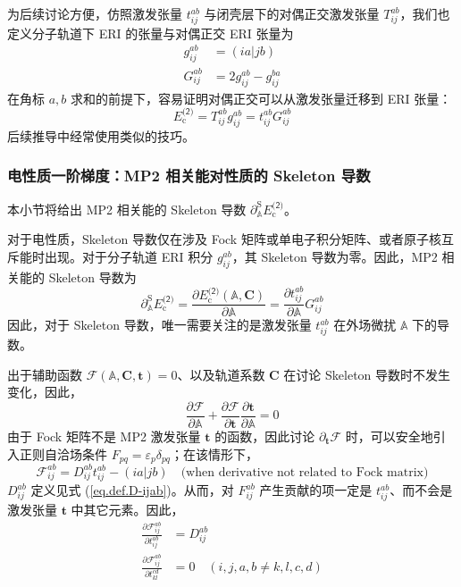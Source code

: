 为后续讨论方便，仿照激发张量 $t_{ij}^{ab}$ 与闭壳层下的对偶正交激发张量 $T_{ij}^{ab}$，我们也定义分子轨道下 ERI 的张量与对偶正交 ERI 张量为
\begin{align}
  g_{ij}^{ab} &= (ia|jb) \\
  G_{ij}^{ab} &= 2 g_{ij}^{ab} - g_{ij}^{ba}
\end{align}
在角标 $a, b$ 求和的前提下，容易证明对偶正交可以从激发张量迁移到 ERI 张量：
\begin{equation}
  E_\mathrm{c}^\textsf{(2)} = T_{ij}^{ab} g_{ij}^{ab} = t_{ij}^{ab} G_{ij}^{ab}
\end{equation}
后续推导中经常使用类似的技巧。

\subsubsection{电性质一阶梯度：MP2 相关能对性质的 Skeleton 导数}
\label{sec.3.skeleton}

本小节将给出 MP2 相关能的 Skeleton 导数 $\partial_\mathbb{A}^\mathrm{S} E_\mathrm{c}^\textsf{(2)}$。

对于电性质，Skeleton 导数仅在涉及 Fock 矩阵或单电子积分矩阵、或者原子核互斥能时出现。对于分子轨道 ERI 积分 $g_{ij}^{ab}$，其 Skeleton 导数为零。因此，MP2 相关能的 Skeleton 导数为
\begin{equation}
  \label{eq.pdSA-Ec-MP2-0}
  \partial_\mathbb{A}^\mathrm{S} E_\mathrm{c}^\textsf{(2)} = \frac{\partial E_\mathrm{c}^\textsf{(2)} (\mathbb{A}, \mathbf{C})}{\partial \mathbb{A}} = \frac{\partial t_{ij}^{ab}}{\partial \mathbb{A}} G_{ij}^{ab}
\end{equation}
因此，对于 Skeleton 导数，唯一需要关注的是激发张量 $t_{ij}^{ab}$ 在外场微扰 $\mathbb{A}$ 下的导数。

出于辅助函数 $\pmb{\mathscr{F}} (\mathbb{A}, \mathbf{C}, \mathbf{t}) = 0$、以及轨道系数 $\mathbf{C}$ 在讨论 Skeleton 导数时不发生变化，因此，
\begin{equation}
  \label{eq.auxfunc-pdA}
  \frac{\partial \pmb{\mathscr{F}}}{\partial \mathbb{A}} + \frac{\partial \pmb{\mathscr{F}}}{\partial \mathbf{t}} \frac{\partial \mathbf{t}}{\partial \mathbb{A}} = 0
\end{equation}
由于 Fock 矩阵不是 MP2 激发张量 $\mathbf{t}$ 的函数，因此讨论 $\partial_\mathbf{t} \pmb{\mathscr{F}}$ 时，可以安全地引入正则自洽场条件 $F_{pq} = \varepsilon_p \delta_{pq}$；在该情形下，
\begin{equation*}
  \mathscr{F}_{ij}^{ab} = D_{ij}^{ab} t_{ij}^{ab} - (ia|jb) \quad \text{(when derivative not related to Fock matrix)}
\end{equation*}
$D_{ij}^{ab}$ 定义见式 (\ref{eq.def.D-ijab})。从而，对 $F_{ij}^{ab}$ 产生贡献的项一定是 $t_{ij}^{ab}$、而不会是激发张量 $\mathbf{t}$ 中其它元素。因此，
\begin{align}
  \label{eq.auxfunc-pdt}
  \frac{\partial \mathscr{F}_{ij}^{ab}}{\partial t_{ij}^{ab}} &= D_{ij}^{ab} \\
  \frac{\partial \mathscr{F}_{ij}^{ab}}{\partial t_{kl}^{cd}} &= 0 \quad (i,j,a,b \neq k,l,c,d)
\end{align}

